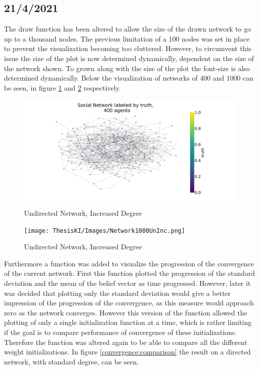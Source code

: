 \documentclass{article}
\begin{document}
\newpage

\subsection{21/4/2021}

The draw function has been altered to allow the size of the drawn network to go up to a thousand nodes. The previous limitation of a 100 nodes was set in place to prevent the visualization becoming too cluttered. However, to circumvent this issue the size of the plot is now determined dynamically, dependent on the size of the network shown. To grown along with the size of the plot the font-size is also determined dynamically. Below the visualization of networks of 400 and 1000 can be seen, in figure \ref{network_400:increased} and \ref{network_1000:increased} respectively.
\begin{center}
    \begin{figure}[!htbp]
        \centering
        \includegraphics[width=.8\textwidth]{ThesisKI/Images/Network400UnInc.png}
        \caption{Undirected Network, Increased Degree}
        \label{network_400:increased}
    \end{figure}
\end{center}

\begin{center}
    \begin{figure}[!htbp]
        \centering
        \texttt{[image: ThesisKI/Images/Network1000UnInc.png]}
        \caption{Undirected Network, Increased Degree}
        \label{network_1000:increased}
    \end{figure}
\end{center}

\newpage

Furthermore a function was added to visualize the progression of the convergence of the current network. First this function plotted the progression of the standard deviation and the mean of the belief vector as time progressed. However, later it was decided that plotting only the standard deviation would give a better impression of the progression of the convergence, as this measure would approach zero as the network converges. However this version of the function allowed the plotting of only a single initialization function at a time, which is rather limiting if the goal is to compare performance of convergence of these initializations. Therefore the function was altered again to be able to compare all the different weight initializations. In figure \ref{convergence:comparison} the result on a directed network, with standard degree, can be seen.
\end{document}
